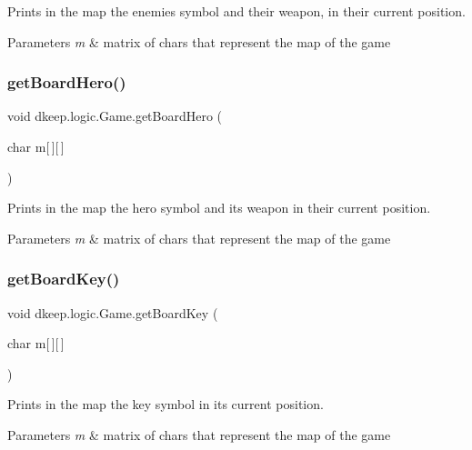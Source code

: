 Prints in the map the enemies symbol and their weapon, in their current position. 
\begin{DoxyParams}{Parameters}
{\em m} & matrix of chars that represent the map of the game \\
\hline
\end{DoxyParams}
\mbox{\label{classdkeep_1_1logic_1_1_game_a4d9a18b2ade5e68657a41d2f2516f696}} 
\subsubsection{\texorpdfstring{get\+Board\+Hero()}{getBoardHero()}}
{\footnotesize\ttfamily void dkeep.\+logic.\+Game.\+get\+Board\+Hero (\begin{DoxyParamCaption}\item[{char}]{m\mbox{[}$\,$\mbox{]}\mbox{[}$\,$\mbox{]} }\end{DoxyParamCaption})}

Prints in the map the hero symbol and its weapon in their current position. 
\begin{DoxyParams}{Parameters}
{\em m} & matrix of chars that represent the map of the game \\
\hline
\end{DoxyParams}
\mbox{\label{classdkeep_1_1logic_1_1_game_a45d8230123f2046b5d5a82ba7e6b2147}} 
\subsubsection{\texorpdfstring{get\+Board\+Key()}{getBoardKey()}}
{\footnotesize\ttfamily void dkeep.\+logic.\+Game.\+get\+Board\+Key (\begin{DoxyParamCaption}\item[{char}]{m\mbox{[}$\,$\mbox{]}\mbox{[}$\,$\mbox{]} }\end{DoxyParamCaption})}

Prints in the map the key symbol in it\textquotesingle{}s current position. 
\begin{DoxyParams}{Parameters}
{\em m} & matrix of chars that represent the map of the game \\
\hline
\end{DoxyParams}
\mbox{\label{classdkeep_1_1logic_1_1_game_ada3e80740d47374027077803c6442ca4}} 
